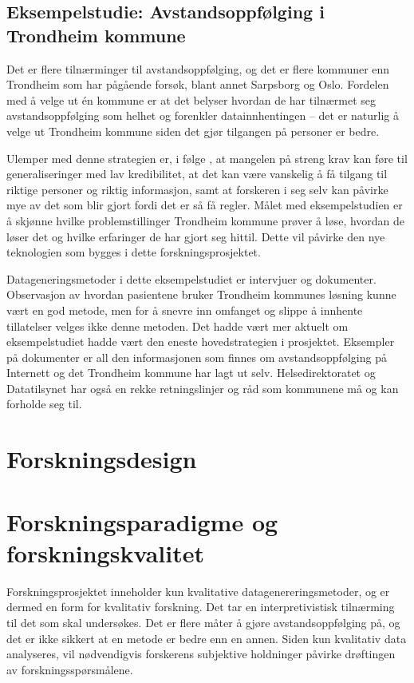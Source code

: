 \subsection{Eksempelstudie: Avstandsoppfølging i Trondheim kommune}

Det er flere tilnærminger til avstandsoppfølging, og det er flere kommuner enn Trondheim som har pågående forsøk, blant annet
Sarpsborg og Oslo. Fordelen med å velge ut én kommune er at det belyser hvordan de har tilnærmet seg avstandsoppfølging
som helhet og forenkler datainnhentingen -- det er naturlig å velge ut Trondheim kommune siden det gjør tilgangen på personer er bedre.

Ulemper med denne strategien er, i følge \citet{oates}, at mangelen på streng krav kan føre til generaliseringer med lav kredibilitet, at det kan være
vanskelig å få tilgang til riktige personer og riktig informasjon, samt at forskeren i seg selv kan påvirke mye av det som blir gjort fordi det er
så få regler. Målet med eksempelstudien er å skjønne hvilke problemstillinger Trondheim kommune prøver å løse, hvordan de løser det og hvilke
erfaringer de har gjort seg hittil. Dette vil påvirke den nye teknologien som bygges i dette forskningsprosjektet.

Datageneringsmetoder i dette eksempelstudiet er intervjuer og dokumenter. Observasjon av hvordan pasientene bruker Trondheim kommunes løsning
kunne vært en god metode, men for å snevre inn omfanget og slippe å innhente tillatelser velges ikke denne metoden. Det hadde vært mer
aktuelt om eksempelstudiet hadde vært den eneste hovedstrategien i prosjektet. Eksempler på dokumenter er all den informasjonen som finnes om
avstandsoppfølging på Internett og det Trondheim kommune har lagt ut selv. Helsedirektoratet og Datatilsynet har også en rekke retningslinjer og råd
som kommunene må og kan forholde seg til.

\section{Forskningsdesign}


\section{Forskningsparadigme og forskningskvalitet}
Forskningsprosjektet inneholder kun kvalitative datagenereringsmetoder, og er dermed en form for kvalitativ forskning. Det tar en interpretivistisk
tilnærming til det som skal undersøkes. Det er flere måter å gjøre avstandsoppfølging på, og det er ikke sikkert at en metode er bedre enn en annen.
Siden kun kvalitativ data analyseres, vil nødvendigvis forskerens subjektive holdninger påvirke drøftingen av forskningsspørsmålene.

